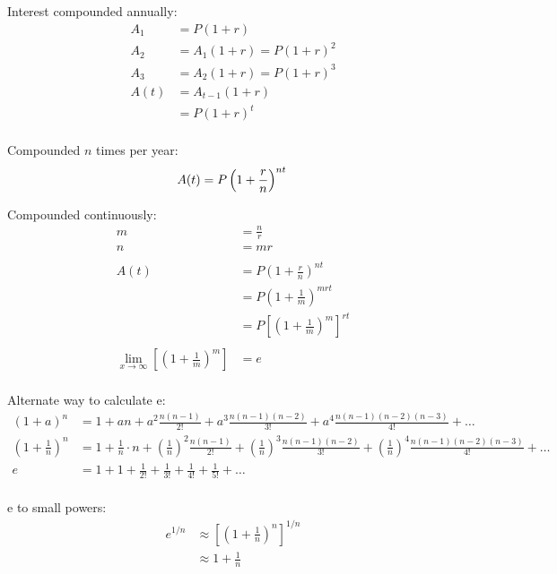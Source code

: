 \documentclass{exam}
\begin{document}
  Interest compounded annually:
  \begin{align*}
    A_1  &= P(1 + r) \\
    A_2  &= A_1(1 + r) = P(1 + r)^2 \\
    A_3  &= A_2(1 + r) = P(1 + r)^3 \\
    A(t) &= A_{t - 1}(1 + r) \\
         &= P(1 + r)^t \\
  \end{align*}

  Compounded $n$ times per year: 
  \[
    A(t) = P \left( 1 + \frac{r}{n} \right)^{nt} \\
  \]

  Compounded continuously:
  \begin{align*}
    m &= \frac{n}{r} \\
    n &= mr \\
    \\
    A(t) &= P\left(1 + \frac{r}{n}\right)^{nt} \\
         &= P\left(1 + \frac{1}{m}\right)^{mrt} \\
         &= P \left[ \left(1 + \frac{1}{m}\right)^{m} \right]^{rt} \\
    \\
    \lim_{x \to \infty} \left[ \left(1 + \frac{1}{m}\right)^{m} \right] &= e \\
  \end{align*}

  Alternate way to calculate e:
  \begin{align*}
    (1 + a)^n           &= 1 + an + a^2 \frac{n (n - 1)}{2!} + a^3 \frac{n(n-1)(n-2)}{3!} + a^4 \frac{n(n-1)(n-2)(n-3)}{4!} + \ldots \\
    (1 + \frac{1}{n})^n &= 1 + \frac{1}{n} \cdot n + \left( \frac{1}{n} \right)^2 \frac{ n (n - 1)}{2!}
        + \left( \frac{1}{n} \right)^3 \frac{n(n-1)(n-2)}{3!} + \left( \frac{1}{n} \right)^4 \frac{n(n-1)(n-2)(n-3)}{4!} + \ldots \\
        e &= 1 + 1 + \frac{1}{2!} + \frac{1}{3!} + \frac{1}{4!} + \frac{1}{5!} + \ldots \\
  \end{align*}

  e to small powers:
  \begin{align*}
    e^{1/n} &\approx \left[ \left( 1 + \frac{1}{n} \right)^n \right]^{1/n} \\
            &\approx 1 + \frac{1}{n} \\
  \end{align*}
\end{document}
